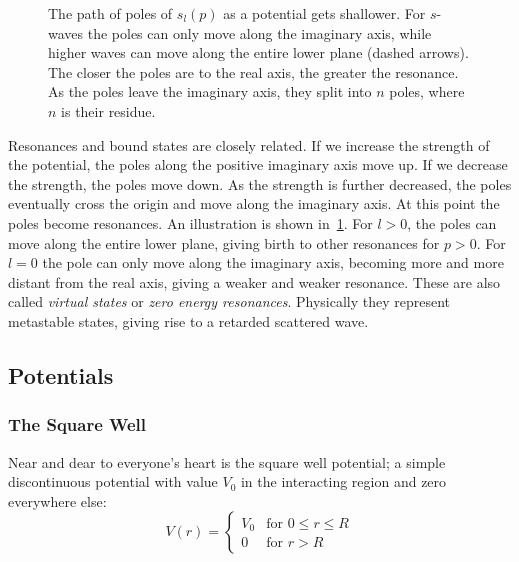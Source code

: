 \begin{figure}[ht!]
  \centering
  \caption{The path of poles of \(s_{l}(p)\) as a potential gets shallower. For
    \(s\)-waves the poles can only move along the imaginary axis, while higher
    waves can move along the entire lower plane (dashed arrows). The closer the
    poles are to the real axis, the greater the resonance. As the poles leave
    the imaginary axis, they split into \(n\) poles, where \(n\) is their residue.}
  \label{fig:resonance}
\end{figure}
Resonances and bound states are closely related. If we increase the strength of
the potential, the poles along the positive imaginary axis move up. If we decrease
the strength, the poles move down. As the strength is further decreased, the poles
eventually cross the origin and move along the imaginary axis. At this point the
poles become resonances. An illustration is shown in~\cref{fig:resonance}. For \(l>0\), the poles can move along the
entire lower plane, giving birth to other resonances for \(p>0\). For \(l=0\) the pole can only move along the
imaginary axis, becoming more and more distant from the real axis,
giving a weaker and weaker resonance. These are also called \textit{virtual
  states} or \textit{zero energy resonances}. Physically they represent 
metastable states, giving rise to a retarded scattered wave\cite[p.~246]{taylor}.

\subsection{Potentials}
\subsubsection{The Square Well}
Near and dear to everyone's heart is the square well potential; a simple discontinuous
potential with value \(V_{0}\) in the interacting region and zero everywhere
else:
\begin{equation*}
  V(r) =
  \begin{cases}
    V_{0} & \text{for } 0 \leq r \leq R\\
    0 & \text{for } r > R 
  \end{cases}
\end{equation*}

